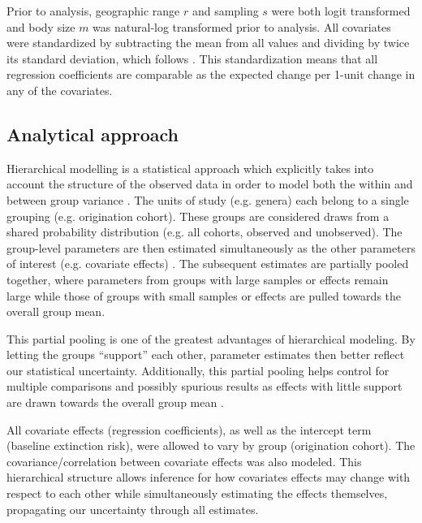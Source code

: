 \documentclass[12pt,letterpaper]{article}
\begin{document}
Prior to analysis, geographic range \(r\) and sampling \(s\) were both logit transformed and body size \(m\) was natural-log transformed prior to analysis. All covariates were standardized by subtracting the mean from all values and dividing by twice its standard deviation, which follows \citet{Gelman2007}. This standardization means that all regression coefficients are comparable as the expected change per 1-unit change in any of the covariates. 


\subsection{Analytical approach}

Hierarchical modelling is a statistical approach which explicitly takes into account the structure of the observed data in order to model both the within and between group variance \citep{Gelman2013d,Gelman2007}. The units of study (e.g. genera) each belong to a single grouping (e.g. origination cohort). These groups are considered draws from a shared probability distribution (e.g. all cohorts, observed and unobserved). The group-level parameters are then estimated simultaneously as the other parameters of interest (e.g. covariate effects) \citep{Gelman2013d}. The subsequent estimates are partially pooled together, where parameters from groups with large samples or effects remain large while those of groups with small samples or effects are pulled towards the overall group mean. 

This partial pooling is one of the greatest advantages of hierarchical modeling. By letting the groups ``support'' each other, parameter estimates then better reflect our statistical uncertainty. Additionally, this partial pooling helps control for multiple comparisons and possibly spurious results as effects with little support are drawn towards the overall group mean \citep{Gelman2013d,Gelman2007}. 

All covariate effects (regression coefficients), as well as the intercept term (baseline extinction risk), were allowed to vary by group (origination cohort). The covariance/correlation between covariate effects was also modeled. This hierarchical structure allows inference for how covariates effects may change with respect to each other while simultaneously estimating the effects themselves, propagating our uncertainty through all estimates. 
\end{document}
